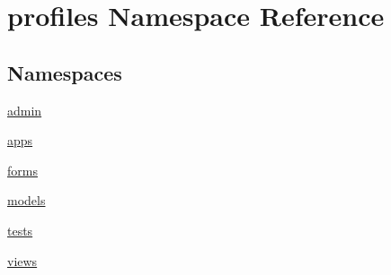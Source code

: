 \hypertarget{namespaceprofiles}{}\section{profiles Namespace Reference}
\label{namespaceprofiles}
\subsection*{Namespaces}
\begin{DoxyCompactItemize}
\item 
 \hyperlink{namespaceprofiles_1_1admin}{admin}
\item 
 \hyperlink{namespaceprofiles_1_1apps}{apps}
\item 
 \hyperlink{namespaceprofiles_1_1forms}{forms}
\item 
 \hyperlink{namespaceprofiles_1_1models}{models}
\item 
 \hyperlink{namespaceprofiles_1_1tests}{tests}
\item 
 \hyperlink{namespaceprofiles_1_1views}{views}
\end{DoxyCompactItemize}
